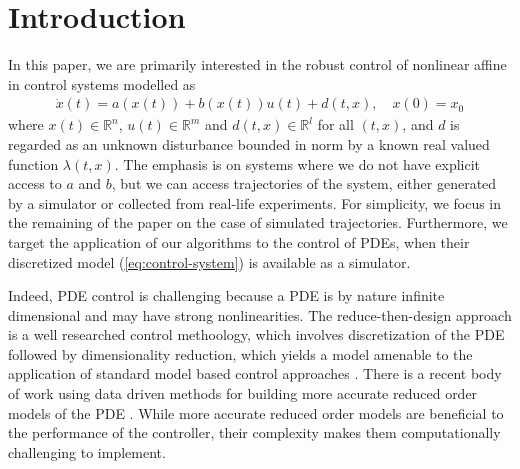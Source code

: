 \documentclass[10pt,a4paper]{amsart}
\newcommand{\R}{\mathbb{R}}
\begin{document}
\section{Introduction}
In this paper, we are primarily interested in the robust control of nonlinear affine in control systems modelled as 
\begin{align}
\dot{x}(t) = a(x(t)) + b(x(t))u(t) + d(t,x), \quad x(0) = x_0
\label{eq:control-system}
\end{align}
where $x(t) \in \R^n$, $u(t) \in \R^m$ and $d(t,x) \in \R^l$ for all $(t,x)$, and $d$ is regarded as an unknown disturbance bounded in norm by a known real valued function $\lambda(t,x)$. The emphasis is on systems where we do not have explicit access to $a$ and $b$, but we can access trajectories of the system, either generated by a simulator or collected from real-life experiments. For simplicity, we focus in the remaining of the paper on the case of simulated trajectories. 
Furthermore, we target the application of our algorithms to the control of PDEs, when their discretized model (\ref{eq:control-system}) is available as a simulator. 

Indeed, PDE control is challenging because a PDE is by nature infinite dimensional and may have strong nonlinearities. 
The reduce-then-design approach is a well researched control methoology, which involves discretization of the PDE followed by dimensionality reduction, which yields a model amenable to the application of standard model based control approaches \cite{ %
leibfritz2007numerical, hovland2008explicit, barbagallo2009closed,sipp2016linear, %
tsolovikos2020estimation}. There is a recent body of work using data driven methods for building more accurate reduced order models of the PDE \cite{%
bhattacharya2021model, fresca2021comprehensive, kaiser2021data}. While more accurate reduced order models are beneficial to the performance of the controller, their complexity makes them computationally challenging to implement. 
\end{document}
